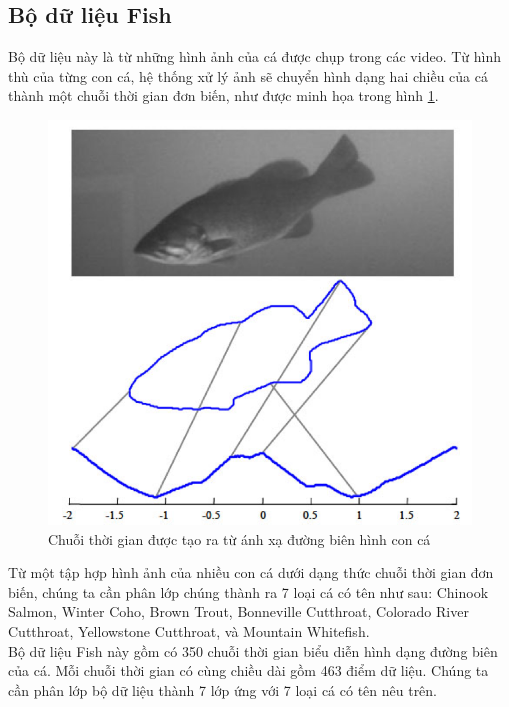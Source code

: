 \documentclass[13pt,oneside]{scrbook}
\begin{document}
\subsection{Bộ dữ liệu Fish}
Bộ dữ liệu này là từ những hình ảnh của cá được chụp trong các video. Từ hình thù của từng con cá, hệ thống xử lý ảnh sẽ chuyển hình dạng hai chiều của cá thành một chuỗi thời gian đơn biến, như được minh họa trong hình \ref{Fish.png}.
\begin{figure}[H]
	\begin{center}
		\includegraphics[width=130mm]{Fish.png}
		\caption{Chuỗi thời gian được tạo ra từ ánh xạ đường biên hình con cá} 
		\label{Fish.png}
	\end{center}
\end{figure}
Từ một tập hợp hình ảnh của nhiều con cá dưới dạng thức chuỗi thời gian đơn biến, chúng ta cần phân lớp chúng thành ra 7 loại cá có tên như sau: Chinook Salmon, Winter Coho, Brown Trout, Bonneville Cutthroat, Colorado River Cutthroat, Yellowstone Cutthroat, và Mountain Whitefish. \\
Bộ dữ liệu Fish này gồm có 350 chuỗi thời gian biểu diễn hình dạng đường biên của cá. Mỗi chuỗi thời gian có cùng chiều dài gồm 463 điểm dữ liệu. 
Chúng ta cần phân lớp bộ dữ liệu thành 7 lớp ứng với 7 loại cá có tên nêu trên.
\end{document}
